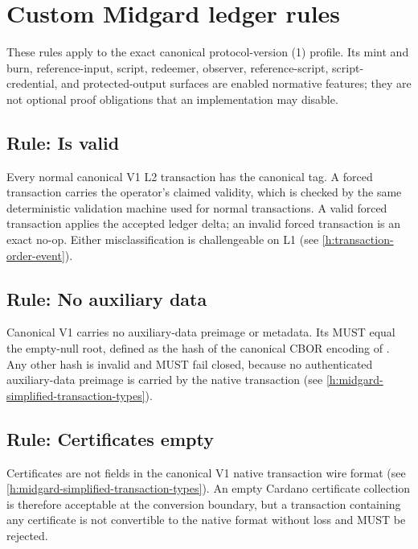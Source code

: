 \documentclass[../midgard.tex]{subfiles}
\begin{document}
\section{Custom Midgard ledger rules}
\label{h:custom-midgard-ledger-rules}

These rules apply to the exact canonical protocol-version (1) profile. Its
mint and burn, reference-input, script, redeemer, observer, reference-script,
script-credential, and protected-output surfaces are enabled normative
features; they are not optional proof obligations that an implementation may
disable.

\subsection{Rule: Is valid}

Every normal canonical V1 L2 transaction has the canonical  tag.
A forced transaction carries the operator's claimed validity, which is checked
by the same deterministic validation machine used for normal transactions.
A valid forced transaction applies the accepted ledger delta; an invalid
forced transaction is an exact no-op. Either misclassification is
challengeable on L1 (see \cref{h:transaction-order-event}).

\subsection{Rule: No auxiliary data}

Canonical V1 carries no auxiliary-data preimage or metadata.  Its
 MUST equal the empty-null root, defined as
the  hash of the canonical CBOR encoding of .
Any other hash is invalid and MUST fail closed, because no authenticated
auxiliary-data preimage is carried by the native transaction (see
\cref{h:midgard-simplified-transaction-types}).

\subsection{Rule: Certificates empty}

Certificates are not fields in the canonical V1 native transaction wire
format (see \cref{h:midgard-simplified-transaction-types}).  An empty Cardano
certificate collection is therefore acceptable at the conversion boundary,
but a transaction containing any certificate is not convertible to the native
format without loss and MUST be rejected.
\end{document}
